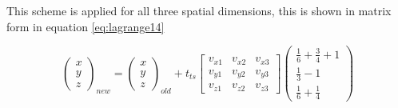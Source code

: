 This scheme is applied for all three spatial dimensions, this is shown in matrix form in equation \ref{eq:lagrange14}

\begin{equation}
\label{eq:lagrange14}
\begin{pmatrix}
x\\
y\\
z
\end{pmatrix}_{new}=\begin{pmatrix}
x\\
y\\
z
\end{pmatrix}_{old}+t_{ts}\begin{bmatrix}
v_{x1}	&	v_{x2}	&	v_{x3}\\
v_{y1}	&	v_{y2}	&	v_{y3}\\
v_{z1}	&	v_{z2}	&	v_{z3}
\end{bmatrix}\begin{pmatrix}
\frac{1}{6}+\frac{3}{4}+1\\
\frac{1}{3}-1\\
\frac{1}{6}+\frac{1}{4}
\end{pmatrix}
\end{equation}









